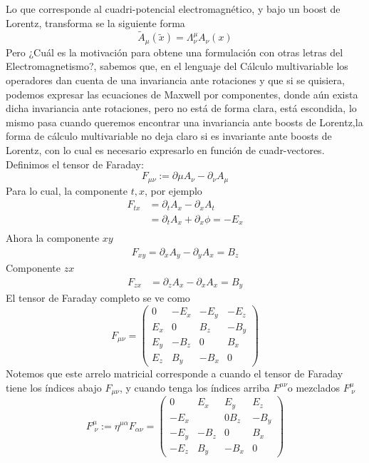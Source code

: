 \documentclass[../main.tex]{subfiles}
\begin{document}
 Lo que corresponde al cuadri-potencial electromagnético, y bajo un boost de Lorentz, transforma se la siguiente forma
 \begin{equation}
   \tilde{A}_\mu (\tilde{x}) = \Lambda^\mu_\nu A_\nu(x)
  \end{equation}
  Pero ¿Cuál es la motivación para obtene una formulación con otras letras del Electromagnetismo?, sabemos que, en el lenguaje del Cálculo multivariable los operadores dan cuenta de una invariancia ante rotaciones y que si se quisiera, podemos expresar las ecuaciones  de Maxwell por componentes, donde aún exista dicha invariancia ante rotaciones, pero no está de forma clara, está escondida, lo mismo pasa cuando queremos encontrar una invariancia ante boosts de Lorentz,la forma de cálculo multivariable no deja claro si es invariante ante boosts de Lorentz, con lo cual es necesario expresarlo en función de cuadr-vectores.\\
  Definimos el tensor de Faraday:
  \begin{equation}
    F_{\mu\nu} :=\partial\mu A_\nu - \partial_\nu A_\mu
   \end{equation}
   Para lo cual, la componente $t,x$, por ejemplo
\begin{align*}
  F_{tx} & = \partial_tA_x - \partial_xA_t \\
  & = \partial_tA_x + \partial_x\phi = -E_x \\
\end{align*}
Ahora la componente $xy$ 
\begin{align*}
  F_{xy} = \partial_xA_y - \partial_yA_x = B_z 
\end{align*}
Componente $zx$
\begin{align*}
  F_{zx} & = \partial_zA_x - \partial_xA_x = B_y
\end{align*}
El tensor de Faraday completo se ve como
\begin{equation}
  F_{\mu \nu} = \begin{pmatrix}
    0 & -E_x & -E_y & -E_z \\ E_x & 0 & B_z & -B_y  \\ E_y & -B_z & 0 & B_x \\ E_z & B_y & -B_x & 0
  \end{pmatrix}
 \end{equation}
Notemos que este arrelo matricial corresponde a cuando el tensor de Faraday tiene los índices abajo $F_{\mu \nu}$, y cuando tenga los índices arriba $F^{\mu \nu}$o mezclados $F^\mu_{\; \nu}$
\begin{equation}
  F^\mu_{\;\nu} := \eta^{\mu \alpha} F_{\alpha \nu} = \begin{pmatrix}
    0 & E_x & E_y & E_z \\ -E_x & & 0 B_z & -B_y \\ -E_y & -B_z & 0 & B_x \\ -E_z & B_y & -B_x & 0
  \end{pmatrix}
 \end{equation}
\end{document}
